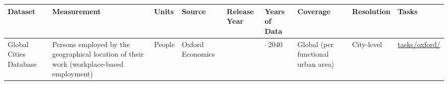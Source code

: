 \documentclass[
  letterpaper,
  DIV=11,
  numbers=noendperiod]{scrreprt}
\newcounter{none} %
\begin{document}
{\def\LTcaptype{none} %
\begin{longtable}[]{@{}
  >{\raggedright\arraybackslash}p{}
  >{\raggedright\arraybackslash}p{}
  >{\raggedright\arraybackslash}p{}
  >{\raggedright\arraybackslash}p{}
  >{\raggedright\arraybackslash}p{}
  >{\raggedright\arraybackslash}p{}
  >{\raggedright\arraybackslash}p{}
  >{\raggedright\arraybackslash}p{}
  >{\raggedright\arraybackslash}p{}@{}}
\toprule\noalign{}
\begin{minipage}[b]{\linewidth}\raggedright
Dataset
\end{minipage} & \begin{minipage}[b]{\linewidth}\raggedright
Measurement
\end{minipage} & \begin{minipage}[b]{\linewidth}\raggedright
Units
\end{minipage} & \begin{minipage}[b]{\linewidth}\raggedright
Source
\end{minipage} & \begin{minipage}[b]{\linewidth}\raggedright
Release Year
\end{minipage} & \begin{minipage}[b]{\linewidth}\raggedright
Years of Data
\end{minipage} & \begin{minipage}[b]{\linewidth}\raggedright
Coverage
\end{minipage} & \begin{minipage}[b]{\linewidth}\raggedright
Resolution
\end{minipage} & \begin{minipage}[b]{\linewidth}\raggedright
Tasks
\end{minipage} \\
\midrule\noalign{}
\endhead
\bottomrule\noalign{}
\endlastfoot
Global Cities Database & Persons employed by the geographical location
of their work (workplace-based employment) & People & Oxford Economics &
2022 & 2000--2040 & Global (per functional urban area) & City-level &
\href{../tasks/oxford/}{tasks/oxford/} \\
\end{longtable}
}
\end{document}
